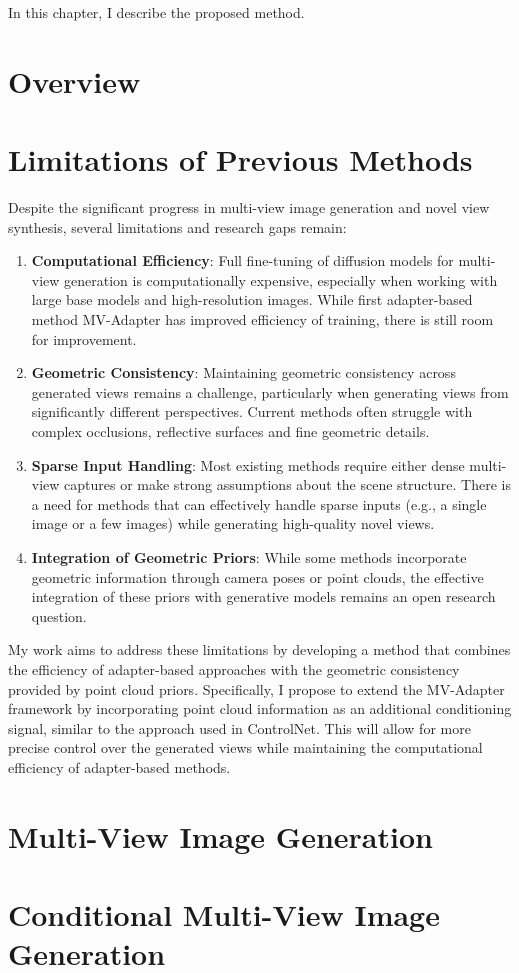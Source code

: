 \label{chapter:proposed-method}

In this chapter, I describe the proposed method.

\section{Overview}

\section{Limitations of Previous Methods}\label{sec:limitations}

Despite the significant progress in multi-view image generation and novel view synthesis, several limitations and research gaps remain:

\begin{enumerate}
    \item \textbf{Computational Efficiency}: Full fine-tuning of diffusion models for multi-view generation is computationally expensive, especially when working with large base models and high-resolution images. While first adapter-based method MV-Adapter has improved efficiency of training, there is still room for improvement.

    \item \textbf{Geometric Consistency}: Maintaining geometric consistency across generated views remains a challenge, particularly when generating views from significantly different perspectives. Current methods often struggle with complex occlusions, reflective surfaces and fine geometric details.

    \item \textbf{Sparse Input Handling}: Most existing methods require either dense multi-view captures or make strong assumptions about the scene structure. There is a need for methods that can effectively handle sparse inputs (e.g., a single image or a few images) while generating high-quality novel views.

    \item \textbf{Integration of Geometric Priors}: While some methods incorporate geometric information through camera poses or point clouds, the effective integration of these priors with generative models remains an open research question.

\end{enumerate}


My work aims to address these limitations by developing a method that combines the efficiency of adapter-based approaches with the geometric consistency provided by point cloud priors. Specifically, I propose to extend the MV-Adapter framework by incorporating point cloud information as an additional conditioning signal, similar to the approach used in ControlNet. This will allow for more precise control over the generated views while maintaining the computational efficiency of adapter-based methods.

\section{Multi-View Image Generation}

\section{Conditional Multi-View Image Generation}
